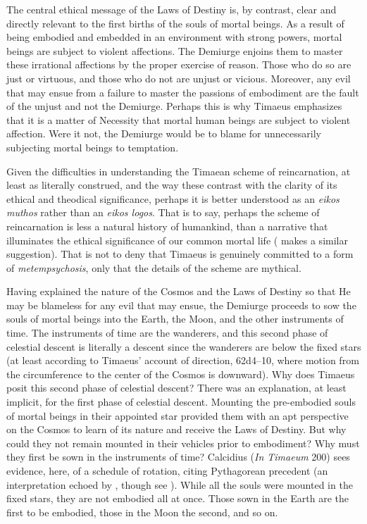 The central ethical message of the Laws of Destiny is, by contrast, clear and directly relevant to the first births of the souls of mortal beings. As a result of being embodied and embedded in an environment with strong powers, mortal beings are subject to violent affections. The Demiurge enjoins them to master these irrational affections by the proper exercise of reason. Those who do so are just or virtuous, and those who do not are unjust or vicious. Moreover, any evil that may ensue from a failure to master the passions of embodiment are the fault of the unjust and not the Demiurge. Perhaps this is why Timaeus emphasizes that it is a matter of Necessity that mortal human beings are subject to violent affection. Were it not, the Demiurge would be to blame for unnecessarily subjecting mortal beings to temptation. 

Given the difficulties in understanding the Timaean scheme of reincarnation, at least as literally construed, and the way these contrast with the clarity of its ethical and theodical significance, perhaps it is better understood as an \emph{eikos muthos} rather than an \emph{eikos logos}. That is to say, perhaps the scheme of reincarnation is less a natural history of humankind, than a narrative that illuminates the ethical significance of our common mortal life (\citealt[262]{Taylor:1929ov} makes a similar suggestion). That is not to deny that Timaeus is genuinely committed to a form of \emph{metempsychosis}, only that the details of the scheme are mythical.

Having explained the nature of the Cosmos and the Laws of Destiny so that He may be blameless for any evil that may ensue, the Demiurge proceeds to sow the souls of mortal beings into the Earth, the Moon, and the other instruments of time. The instruments of time are the wanderers, and this second phase of celestial descent is literally a descent since the wanderers are below the fixed stars (at least according to Timaeus' account of direction, 62d4--10, where motion from the circumference to the center of the Cosmos is downward). Why does Timaeus posit this second phase of celestial descent? There was an explanation, at least implicit, for the first phase of celestial descent. Mounting the pre-embodied souls of mortal beings in their appointed star provided them with an apt perspective on the Cosmos to learn of its nature and receive the Laws of Destiny. But why could they not remain mounted in their vehicles prior to embodiment? Why must they first be sown in the instruments of time? Calcidius (\emph{In Timaeum} 200) sees evidence, here, of a schedule of rotation, citing Pythagorean precedent (an interpretation echoed by \citealt[146]{Cornford:1935fk}, though see \citealt[258--9]{Taylor:1928qb}). While all the souls were mounted in the fixed stars, they are not embodied all at once. Those sown in the Earth are the first to be embodied, those in the Moon the second, and so on. 

